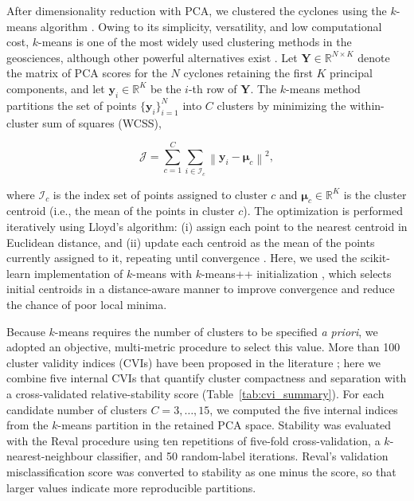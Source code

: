 \documentclass[pdflatex,sn-chicago]{sn-jnl}%
\theoremstyle{plain}
\theoremstyle{definition}
\theoremstyle{remark}
\theoremstyle{definition}
\begin{document}
After dimensionality reduction with PCA, we clustered the cyclones using the $k$-means algorithm \citep{macqueen1967}. Owing to its simplicity, versatility, and low computational cost, $k$-means is one of the most widely used clustering methods in the geosciences, although other powerful alternatives exist \citep[e.g.,][]{fachieri2025introduccao}. Let $\mathbf{Y}\in\mathbb{R}^{N\times K}$ denote the matrix of PCA scores for the $N$ cyclones retaining the first $K$ principal components, and let $\mathbf{y}_i\in\mathbb{R}^{K}$ be the $i$-th row of $\mathbf{Y}$. The $k$-means method partitions the set of points $\{\mathbf{y}_i\}_{i=1}^{N}$ into $C$ clusters by minimizing the within-cluster sum of squares (WCSS),

\begin{equation}
\mathcal{J} = \sum_{c=1}^{C}\sum_{i \in \mathcal{I}_c}\left\lVert \mathbf{y}_i - \boldsymbol{\mu}_c \right\rVert^2,
\end{equation}

where $\mathcal{I}_c$ is the index set of points assigned to cluster $c$ and $\boldsymbol{\mu}_c\in\mathbb{R}^{K}$ is the cluster centroid (i.e., the mean of the points in cluster $c$). The optimization is performed iteratively using Lloyd's algorithm: (i) assign each point to the nearest centroid in Euclidean distance, and (ii) update each centroid as the mean of the points currently assigned to it, repeating until convergence \citep{lloyd1982least}. Here, we used the scikit-learn implementation of $k$-means with $k$-means++ initialization \citep{arthur2006k}, which selects initial centroids in a distance-aware manner to improve convergence and reduce the chance of poor local minima.

Because $k$-means requires the number of clusters to be specified \emph{a priori}, we adopted an objective, multi-metric procedure to select this value. More than 100 cluster validity indices (CVIs) have been proposed in the literature \citep{arbelaitz2013extensive,hassan2024z}; here we combine five internal CVIs that quantify cluster compactness and separation with a cross-validated relative-stability score (Table~\ref{tab:cvi_summary}). For each candidate number of clusters $C=3,\ldots,15$, we computed the five internal indices from the $k$-means partition in the retained PCA space. Stability was evaluated with the Reval procedure using ten repetitions of five-fold cross-validation, a $k$-nearest-neighbour classifier, and 50 random-label iterations. Reval's validation misclassification score was converted to stability as one minus the score, so that larger values indicate more reproducible partitions.
\end{document}
